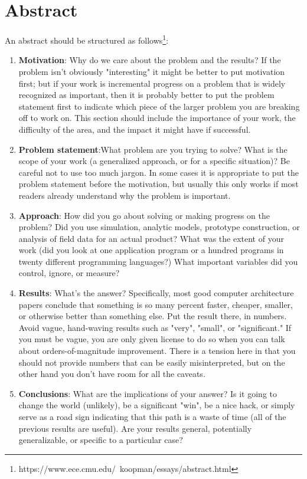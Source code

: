 \chapter*{Abstract}

An abstract should be structured as
follows\footnote{https://www.ece.cmu.edu/~koopman/essays/abstract.html}:

\begin{enumerate}
  \item \textbf{Motivation}: Why do we care about the problem and the results?
  If the problem isn't obviously "interesting" it might be better to put
  motivation first; but if your work is
  incremental progress on a problem that is widely recognized as important, then it is probably better to put the
  problem statement first to indicate which piece of the larger problem you are
  breaking off to work on. This section should include the importance of your
  work, the difficulty of the area, and the impact it might have if successful.

  \item \textbf{Problem statement}:What problem are you trying to solve? What is
  the scope of your work (a generalized approach, or for a specific situation)?
  Be careful not to use too much jargon. In some cases it is appropriate to put
  the problem statement before the motivation, but usually this only works if
  most readers already understand why the problem is important.

  \item \textbf{Approach}: How did you go about solving or making progress on
  the problem? Did you use simulation, analytic models, prototype construction,
  or analysis of field data for an actual product? What was the extent of your
  work (did you look at one application program or a hundred programs in twenty
  different programming languages?) What important variables did you control,
  ignore, or measure?

  \item \textbf{Results}: What's the answer? Specifically, most good computer
  architecture papers conclude that something is so many percent faster,
  cheaper, smaller, or otherwise better than something else. Put the result
  there, in numbers. Avoid vague, hand-waving results such as "very", "small",
  or "significant." If you must be vague, you are only given license to do so
  when you can talk about orders-of-magnitude improvement. There is a tension
  here in that you should not provide numbers that can be easily misinterpreted,
  but on the other hand you don't have room for all the caveats.

  \item \textbf{Conclusions}: What are the implications of your answer? Is it
  going to change the world (unlikely), be a significant "win", be a nice hack,
  or simply serve as a road sign indicating that this path is a waste of time
  (all of the previous results are useful). Are your results general,
  potentially generalizable, or specific to a particular case?
\end{enumerate}